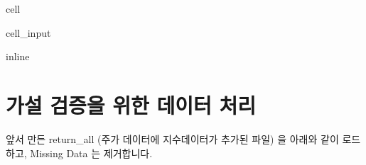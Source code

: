 \documentclass[letterpaper,10pt,english]{jupyterBook}
\begin{document}
\begin{sphinxuseclass}{cell}\begin{sphinxVerbatimInput}

\begin{sphinxuseclass}{cell_input}
\begin{sphinxVerbatim}[commandchars=\\\{\}]
   
 inline
   
   
   
 
  
 
\end{sphinxVerbatim}

\end{sphinxuseclass}\end{sphinxVerbatimInput}

\end{sphinxuseclass}

\section{가설 검증을 위한 데이터 처리}
\label{\detokenize{chapter4/4.4.4_Data_Processing:id1}}\label{\detokenize{chapter4/4.4.4_Data_Processing::doc}}
\sphinxAtStartPar
앞서 만든 return\_all (주가 데이터에 지수데이터가 추가된 파일) 을 아래와 같이 로드하고, Missing Data 는 제거합니다.
\end{document}
